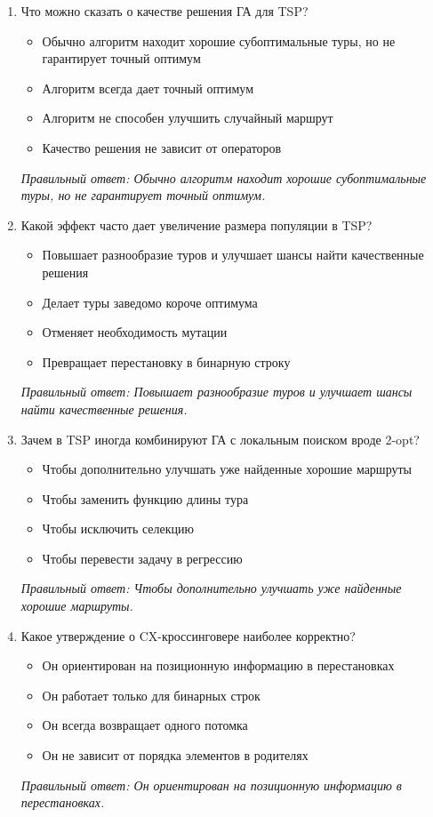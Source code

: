 \begin{enumerate}[label=\textbf{\arabic*.}, leftmargin=0pt, itemsep=1.2em]
\item Что можно сказать о качестве решения ГА для TSP?
\begin{itemize}[label=$\square$, leftmargin=1.5cm, itemsep=0.2em, topsep=0.3em]
\item Обычно алгоритм находит хорошие субоптимальные туры, но не гарантирует точный оптимум
\item Алгоритм всегда дает точный оптимум
\item Алгоритм не способен улучшить случайный маршрут
\item Качество решения не зависит от операторов
\end{itemize}
{\small\textit{Правильный ответ: Обычно алгоритм находит хорошие субоптимальные туры, но не гарантирует точный оптимум.}}

\item Какой эффект часто дает увеличение размера популяции в TSP?
\begin{itemize}[label=$\square$, leftmargin=1.5cm, itemsep=0.2em, topsep=0.3em]
\item Повышает разнообразие туров и улучшает шансы найти качественные решения
\item Делает туры заведомо короче оптимума
\item Отменяет необходимость мутации
\item Превращает перестановку в бинарную строку
\end{itemize}
{\small\textit{Правильный ответ: Повышает разнообразие туров и улучшает шансы найти качественные решения.}}

\item Зачем в TSP иногда комбинируют ГА с локальным поиском вроде 2-opt?
\begin{itemize}[label=$\square$, leftmargin=1.5cm, itemsep=0.2em, topsep=0.3em]
\item Чтобы дополнительно улучшать уже найденные хорошие маршруты
\item Чтобы заменить функцию длины тура
\item Чтобы исключить селекцию
\item Чтобы перевести задачу в регрессию
\end{itemize}
{\small\textit{Правильный ответ: Чтобы дополнительно улучшать уже найденные хорошие маршруты.}}

\item Какое утверждение о CX-кроссинговере наиболее корректно?
\begin{itemize}[label=$\square$, leftmargin=1.5cm, itemsep=0.2em, topsep=0.3em]
\item Он ориентирован на позиционную информацию в перестановках
\item Он работает только для бинарных строк
\item Он всегда возвращает одного потомка
\item Он не зависит от порядка элементов в родителях
\end{itemize}
{\small\textit{Правильный ответ: Он ориентирован на позиционную информацию в перестановках.}}


\end{enumerate}
